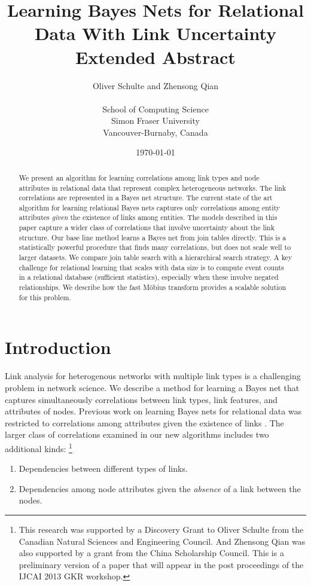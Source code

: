 \documentclass{article}
\begin{document}
\title{Learning Bayes Nets for Relational Data With Link Uncertainty\\
Extended Abstract}
\author{Oliver Schulte and Zhensong Qian\\
\\ School of Computing Science\\ Simon Fraser University\\Vancouver-Burnaby, Canada}
\date{\today}
\maketitle

\begin{abstract} We present an algorithm for learning correlations among link types and node attributes in relational data that represent complex heterogeneous networks. The link correlations are represented in a Bayes net structure. The current state of the art algorithm for learning relational Bayes nets captures only correlations among entity attributes {\em given} the existence of links among entities. The models described in this paper capture a wider class of correlations that involve uncertainty about the link structure. Our base line method learns a Bayes net from join tables directly. This is  a statistically powerful procedure that finds many correlations, but does not scale well to larger datasets. We compare join table search with a hierarchical search strategy. A key challenge for relational learning that scales with data size is to compute event counts in a relational database (sufficient statistics), especially when these involve negated relationships. We describe how the fast M\"obius transform provides a scalable solution for this problem.
\end{abstract}


\section{Introduction} Link analysis for heterogenous networks with multiple link types is a challenging problem in network science. We describe a method for learning a Bayes net that captures simultaneously correlations between link types, link features, and attributes of nodes. Previous work on learning Bayes nets for relational data was restricted to correlations among attributes given the existence of links \cite{Schulte2012}. The larger class of correlations examined in our new algorithms includes two additional kinds:
\footnote{
This research was supported by a Discovery Grant to Oliver Schulte from the Canadian Natural Sciences and Engineering Council. 
And Zhensong Qian was also supported by a grant from the China Scholarship Council.
This is a preliminary version of a paper that will appear in the post proceedings of the IJCAI 2013 GKR workshop.
}
\begin{enumerate}
\item Dependencies between different types of links.
\item Dependencies among node attributes given the {\em absence} of a link between the nodes.
\end{enumerate}
\end{document}
